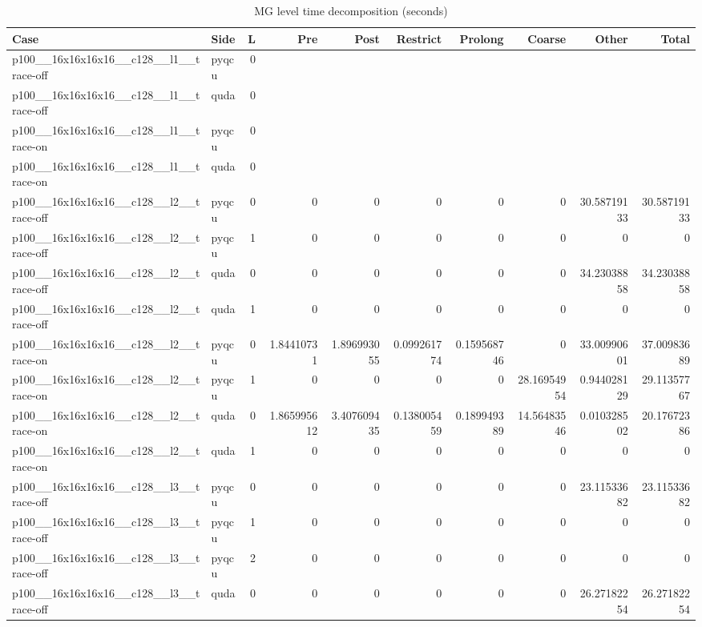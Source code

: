 
\begin{table}[htbp]
\centering
\caption{MG level time decomposition (seconds)}
\small
\begin{tabular}{@{}llrrrrrrrr@{}}
\toprule
Case & Side & L & Pre & Post & Restrict & Prolong & Coarse & Other & Total \\
\midrule
p100\_\_16x16x16x16\_\_c128\_\_l1\_\_trace-off & pyqcu & 0 &  &  &  &  &  &  &  \\
p100\_\_16x16x16x16\_\_c128\_\_l1\_\_trace-off & quda & 0 &  &  &  &  &  &  &  \\
p100\_\_16x16x16x16\_\_c128\_\_l1\_\_trace-on & pyqcu & 0 &  &  &  &  &  &  &  \\
p100\_\_16x16x16x16\_\_c128\_\_l1\_\_trace-on & quda & 0 &  &  &  &  &  &  &  \\
p100\_\_16x16x16x16\_\_c128\_\_l2\_\_trace-off & pyqcu & 0 & 0 & 0 & 0 & 0 & 0 & 30.58719133 & 30.58719133 \\
p100\_\_16x16x16x16\_\_c128\_\_l2\_\_trace-off & pyqcu & 1 & 0 & 0 & 0 & 0 & 0 & 0 & 0 \\
p100\_\_16x16x16x16\_\_c128\_\_l2\_\_trace-off & quda & 0 & 0 & 0 & 0 & 0 & 0 & 34.23038858 & 34.23038858 \\
p100\_\_16x16x16x16\_\_c128\_\_l2\_\_trace-off & quda & 1 & 0 & 0 & 0 & 0 & 0 & 0 & 0 \\
p100\_\_16x16x16x16\_\_c128\_\_l2\_\_trace-on & pyqcu & 0 & 1.84410731 & 1.896993055 & 0.099261774 & 0.159568746 & 0 & 33.00990601 & 37.00983689 \\
p100\_\_16x16x16x16\_\_c128\_\_l2\_\_trace-on & pyqcu & 1 & 0 & 0 & 0 & 0 & 28.16954954 & 0.944028129 & 29.11357767 \\
p100\_\_16x16x16x16\_\_c128\_\_l2\_\_trace-on & quda & 0 & 1.865995612 & 3.407609435 & 0.138005459 & 0.189949389 & 14.56483546 & 0.010328502 & 20.17672386 \\
p100\_\_16x16x16x16\_\_c128\_\_l2\_\_trace-on & quda & 1 & 0 & 0 & 0 & 0 & 0 & 0 & 0 \\
p100\_\_16x16x16x16\_\_c128\_\_l3\_\_trace-off & pyqcu & 0 & 0 & 0 & 0 & 0 & 0 & 23.11533682 & 23.11533682 \\
p100\_\_16x16x16x16\_\_c128\_\_l3\_\_trace-off & pyqcu & 1 & 0 & 0 & 0 & 0 & 0 & 0 & 0 \\
p100\_\_16x16x16x16\_\_c128\_\_l3\_\_trace-off & pyqcu & 2 & 0 & 0 & 0 & 0 & 0 & 0 & 0 \\
p100\_\_16x16x16x16\_\_c128\_\_l3\_\_trace-off & quda & 0 & 0 & 0 & 0 & 0 & 0 & 26.27182254 & 26.27182254 \\

\end{tabular}
\end{table}
